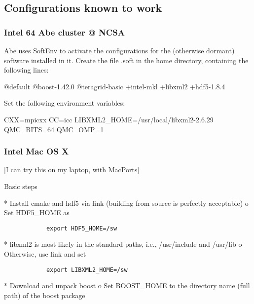 
\subsection{Configurations known to work}
\subsubsection{Intel 64 Abe cluster @ NCSA}
Abe uses SoftEnv to activate the configurations for the (otherwise dormant) software installed in it.  Create the file .soft in the home directory, containing the following lines:
\begin{console}
@default
@boost-1.42.0
@teragrid-basic
+intel-mkl
+libxml2
+hdf5-1.8.4
\end{console}
Set the following environment variables:
\begin{console}
CXX=mpicxx
CC=icc
LIBXML2\_HOME=/usr/local/libxml2-2.6.29
QMC\_BITS=64
QMC\_OMP=1
\end{console}

\subsubsection{Intel Mac OS X}
[I can try this on my laptop, with MacPorts]

Basic steps

    * Install cmake and hdf5 via fink (building from source is perfectly acceptable)
          o Set HDF5\_HOME as

\begin{verbatim}
            export HDF5_HOME=/sw
\end{verbatim}

    * libxml2 is most likely in the standard paths, i.e., /usr/include and /usr/lib
          o Otherwise, use fink and set

\begin{verbatim}
            export LIBXML2_HOME=/sw
\end{verbatim}

    * Download and unpack boost
          o Set BOOST\_HOME to the directory name (full path) of the boost package 

